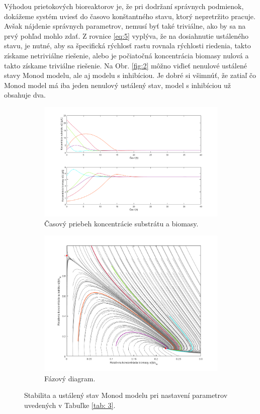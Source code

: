 Výhodou prietokových bioreaktorov je, že pri dodržaní správnych podmienok, dokážeme systém uviesť do časovo konštantného stavu, ktorý nepretržito pracuje. Avšak nájdenie správnych parametrov, nemusí byť také triviálne, ako by sa na prvý pohľad mohlo zdať. Z rovnice \ref{eq:5}
vyplýva, že na dosiahnutie ustáleného stavu, je nutné, aby sa špecifická rýchlosť rastu rovnala rýchlosti riedenia, takto získame netriviálne riešenie, alebo je počiatočná koncentrácia biomasy nulová a takto získame triviálne riešenie. Na Obr. \ref{fig:2} môžno viďieť nenulové ustálené stavy Monod modelu, ale aj modelu s inhibíciou. Je dobré si všimnúť, že zatiaľ čo Monod model má iba jeden nenulový ustálený stav, model s inhibíciou už obsahuje dva.

\begin{figure}[H]
	\begin{subfigure}{.5\textwidth}
		\centering
		\includegraphics[width=1\linewidth]{images/init_cond_Monod}
		\caption[]{Časový priebeh koncentrácie substrátu a biomasy.}
	\end{subfigure}
	\begin{subfigure}{.5\textwidth}
		\centering
		\includegraphics[width=1\linewidth]{images/phase_Monod}
		\caption[]{Fázový diagram.}
	\end{subfigure}
	\caption{Stabilita a ustálený stav Monod modelu pri nastavení parametrov uvedených v Tabuľke \ref{tab: 3}.}
	\label{fig:4}
\end{figure}

